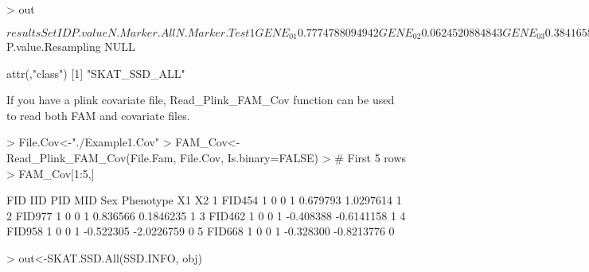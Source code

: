 \documentclass[11pt]{article}
\begin{document}
\begin{Schunk}
\begin{Sinput}
> out
\end{Sinput}
\begin{Soutput}
$results
     SetID    P.value N.Marker.All N.Marker.Test
1  GENE_01 0.77747880           94            94
2  GENE_02 0.06245208           84            84
3  GENE_03 0.38416582          108           108
4  GENE_04 0.46179268          101           101
5  GENE_05 0.18548863          103           103
6  GENE_06 0.93255760           94            94
7  GENE_07 0.18897220          104           104
8  GENE_08 0.73081683           96            96
9  GENE_09 0.67366458          100           100
10 GENE_10 0.40310682          100           100

$P.value.Resampling
NULL

attr(,"class")
[1] "SKAT_SSD_ALL"
\end{Soutput}
\end{Schunk}

If you have a plink covariate file, Read\_Plink\_FAM\_Cov function can be used to read both FAM and covariate files. 

\begin{Schunk}
\begin{Sinput}
> File.Cov<-"./Example1.Cov"
> FAM_Cov<-Read_Plink_FAM_Cov(File.Fam, File.Cov, Is.binary=FALSE)
> # First 5 rows
> FAM_Cov[1:5,]
\end{Sinput}
\begin{Soutput}
     FID IID PID MID Sex Phenotype         X1 X2
1 FID454   1   0   0   1  0.679793  1.0297614  1
2 FID977   1   0   0   1  0.836566  0.1846235  1
3 FID462   1   0   0   1 -0.408388 -0.6141158  1
4 FID958   1   0   0   1 -0.522305 -2.0226759  0
5 FID668   1   0   0   1 -0.328300 -0.8213776  0
\end{Soutput}
\end{Schunk}

\begin{Schunk}
\begin{Sinput}
> out<-SKAT.SSD.All(SSD.INFO, obj)
\end{Sinput}
\end{Schunk}
\end{document}
